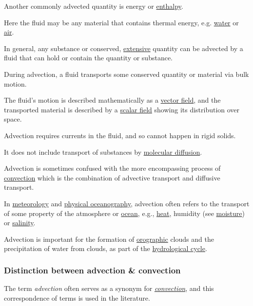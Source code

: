 \documentclass{article}
\begin{document}
Another commonly advected quantity is energy or \href{https://en.wikipedia.org/wiki/Enthalpy}{enthalpy}.

Here the fluid may be any material that contains thermal energy, e.g. \href{https://en.wikipedia.org/wiki/Water}{water} or \href{https://en.wikipedia.org/wiki/Air}{air}.

In general, any substance or conserved, \href{https://en.wikipedia.org/wiki/Intensive_and_extensive_properties}{extensive} quantity can be advected by a fluid that can hold or contain the quantity or substance.

%
During advection, a fluid transports some conserved quantity or material via bulk motion.

The fluid's motion is described mathematically as a \href{https://en.wikipedia.org/wiki/Vector_field}{vector field}, and the transported material is described by a \href{https://en.wikipedia.org/wiki/Scalar_field}{scalar field} showing its distribution over space.

Advection requires currents in the fluid, and so cannot happen in rigid solids.

It does not include transport of substances by \href{https://en.wikipedia.org/wiki/Molecular_diffusion}{molecular diffusion}.

%
Advection is sometimes confused with the more encompassing process of \href{https://en.wikipedia.org/wiki/Convection}{convection} which is the combination of advective transport and diffusive transport.

%
In \href{https://en.wikipedia.org/wiki/Meteorology}{meteorology} and \href{https://en.wikipedia.org/wiki/Physical_oceanography}{physical oceanography}, advection often refers to the transport of some property of the atmosphere or \href{https://en.wikipedia.org/wiki/Ocean}{ocean}, e.g., \href{https://en.wikipedia.org/wiki/Heat}{heat}, humidity (see \href{https://en.wikipedia.org/wiki/Water_vapor}{moisture}) or \href{https://en.wikipedia.org/wiki/Salinity}{salinity}.

Advection is important for the formation of \href{https://en.wikipedia.org/wiki/Orographic}{orographic} clouds and the precipitation of water from clouds, as part of the \href{https://en.wikipedia.org/wiki/Hydrological_cycle}{hydrological cycle}.

\subsubsection{Distinction between advection \& convection}
The term \textit{advection} often serves as a synonym for \href{https://en.wikipedia.org/wiki/Convection}{\textit{convection}}, and this correspondence of terms is used in the literature.
\end{document}
